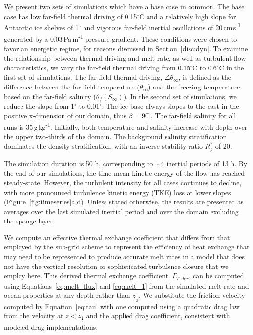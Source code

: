 \documentclass[draft]{styles/agujournal2019}
\begin{document}
We present two sets of simulations which have a base case in common. The base case has low far-field thermal driving of 0.15$^{\circ}$C and a relatively high slope for Antarctic ice shelves of 1$^{\circ}$ and vigorous far-field inertial oscillations of 20\,cm\,s\textsuperscript{-1} generated by a 0.03\,Pa\,m\textsuperscript{-1} pressure gradient. These conditions were chosen to favor an energetic regime, for reasons discussed in Section~\ref{disc:dyn}. To examine the relationship between thermal driving and melt rate, as well as turbulent flow characteristics, we vary the far-field thermal driving from 0.15$^{\circ}$C to 0.6$^{\circ}$C in the first set of simulations. The far-field thermal driving, $\Delta \theta_\infty$, is defined as the difference between the far-field temperature ($\theta_{\infty}$) and the freezing temperature based on the far-field salinity ($\theta_f(S_{\infty})$). In the second set of simulations, we reduce the slope from 1$^{\circ}$ to 0.01$^{\circ}$. The ice base always slopes to the east in the positive x-dimension of our domain, thus $\beta = 90^{\circ}$. The far-field salinity for all runs is 35\,g\,kg\textsuperscript{-1}. Initially, both temperature and salinity increase with depth over the upper two-thirds of the domain. The background salinity stratification dominates the density stratification, with an inverse stability ratio $R_\rho^*$ of 20. 

The simulation duration is 50 h, corresponding to $\sim$4 inertial periods of 13 h. By the end of our simulations, the time-mean kinetic energy of the flow has reached steady-state. However, the turbulent intensity for all cases continues to decline, with more pronounced turbulence kinetic energy (TKE) loss at lower slopes (Figure~\ref{fig:timeseries}a,d). Unless stated otherwise, the results are presented as averages over the last simulated inertial period and over the domain excluding the sponge layer.

We compute an effective thermal exchange coefficient that differs from that employed by the sub-grid scheme to represent the efficiency of heat exchange that may need to be represented to produce accurate melt rates in a model that does not have the vertical resolution or sophisticated turbulence closure that we employ here. This derived thermal exchange coefficient, $\Gamma_{T,der}$, can be computed using Equations~\ref{eq:melt_flux} and \ref{eq:melt_1} from the simulated melt rate and ocean properties at any depth rather than $z_{\frac{1}{2}}$. We substitute the friction velocity computed by Equation~\ref{eq:tau} with one computed using a quadratic drag law from the velocity at $z < z_{\frac{1}{2}}$ and the applied drag coefficient, consistent with modeled drag implementations. 
\end{document}
